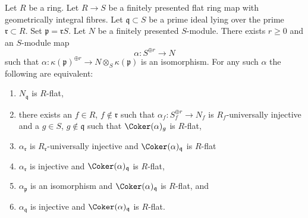\begin{lemma}
\label{lemma-induction-step-fp}
Let $R$ be a ring. Let $R \to S$ be a finitely presented
flat ring map with geometrically integral fibres. Let
$\mathfrak q \subset S$ be a prime ideal lying over the prime
$\mathfrak r \subset R$. Set $\mathfrak p = \mathfrak r S$.
Let $N$ be a finitely presented $S$-module.
There exists $r \geq 0$ and an $S$-module map
$$
\alpha : S^{\oplus r} \longrightarrow N
$$
such that
$\alpha : \kappa(\mathfrak p)^{\oplus r} \to N \otimes_S \kappa(\mathfrak p)$
is an isomorphism. For any such $\alpha$ the following are equivalent:
\begin{enumerate}
\item $N_{\mathfrak q}$ is $R$-flat,
\item there exists an $f \in R$, $f \not \in \mathfrak r$ such that
$\alpha_f : S_f^{\oplus r} \to N_f$ is $R_f$-universally injective and
a $g \in S$, $g \not \in \mathfrak q$ such that $\Coker(\alpha)_g$
is $R$-flat,
\item $\alpha_{\mathfrak r}$ is $R_{\mathfrak r}$-universally injective and
$\Coker(\alpha)_{\mathfrak q}$ is $R$-flat
\item $\alpha_{\mathfrak r}$ is injective and
$\Coker(\alpha)_{\mathfrak q}$ is $R$-flat,
\item $\alpha_{\mathfrak p}$ is an isomorphism and
$\Coker(\alpha)_{\mathfrak q}$ is $R$-flat, and
\item $\alpha_{\mathfrak q}$ is injective and
$\Coker(\alpha)_{\mathfrak q}$ is $R$-flat.
\end{enumerate}
\end{lemma}

